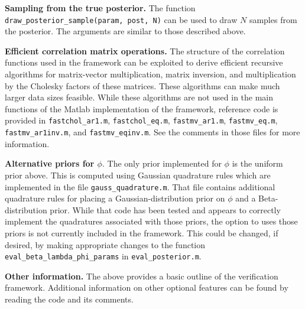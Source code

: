 \documentclass{book}
\begin{document}
\vspace{.1in}
\textbf{Sampling from the true posterior.} The function {\tt draw\_posterior\_sample(param, post, N)} can be used
to draw $N$ samples from the posterior. The arguments are similar to those described above. 

\vspace{.1in}
\textbf{Efficient correlation matrix operations.} The structure of the correlation functions used in the framework
can be exploited to derive efficient recursive algorithms for matrix-vector multiplication, matrix inversion, and
multiplication by the Cholesky factors of these matrices. These algorithms can make much larger data sizes
feasible. While these algorithms are not used in the main functions of the Matlab implementation of the framework,
reference code is provided in {\tt fastchol\_ar1.m}, {\tt fastchol\_eq.m}, {\tt fastmv\_ar1.m}, {\tt fastmv\_eq.m}, 
{\tt fastmv\_ar1inv.m}, and {\tt fastmv\_eqinv.m}. See the comments in those files for more information. 

\vspace{.1in}
\textbf{Alternative priors for $\phi$}. The only prior implemented for $\phi$ is the uniform prior above. This is
computed using Gaussian quadrature rules which are implemented in the file {\tt gauss\_quadrature.m}. That
file contains additional quadrature rules for placing a Gaussian-distribution prior on $\phi$ and a
Beta-distribution prior. While that code has been tested and appears to correctly implement the quadratures 
associated with those priors, the option to uses those priors is not currently included in the framework. This
could be changed, if desired, by making appropriate changes to the function {\tt eval\_beta\_lambda\_phi\_params} 
in {\tt eval\_posterior.m}. 

\vspace{.1in}
\textbf{Other information.} The above provides a basic outline of the verification framework. Additional information
on other optional features can be found by reading the code and its comments. 




\end{document}
